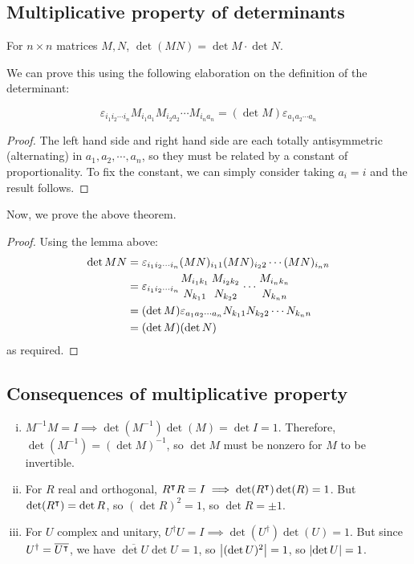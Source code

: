 \subsection{Multiplicative property of determinants}
\begin{theorem}
	For \(n\times n\) matrices \(M, N\), \(\det (MN) = \det M \cdot \det N\).
\end{theorem}
\noindent We can prove this using the following elaboration on the definition of the determinant:
\begin{lemma}
	\[
		\varepsilon_{i_1 i_2 \cdots i_n} M_{i_1 a_1} M_{i_2 a_2} \cdots M_{i_n a_n} = (\det M) \varepsilon_{a_1 a_2 \cdots a_n}
	\]
\end{lemma}
\begin{proof}
	The left hand side and right hand side are each totally antisymmetric (alternating) in \(a_1, a_2, \cdots, a_n\), so they must be related by a constant of proportionality.
	To fix the constant, we can simply consider taking \(a_i = i\) and the result follows.
\end{proof}
\noindent Now, we prove the above theorem.
\begin{proof}
	Using the lemma above:
	\begin{align*}
		\det MN & = \varepsilon_{i_1 i_2 \cdots i_n} (MN)_{i_1 1} (MN)_{i_2 2} \cdots (MN)_{i_n n}                                                    \\
		        & = \varepsilon_{i_1 i_2 \cdots i_n} {M_{i_1 k_1} \atop N_{k_1 1}} {M_{i_2 k_2} \atop N_{k_2 2}} \cdots {M_{i_n k_n} \atop N_{k_n n}} \\
		        & = (\det M) \varepsilon_{a_1 a_2 \cdots a_n} N_{k_1 1} N_{k_2 2} \cdots N_{k_n n}                                                    \\
		        & = (\det M)(\det N)
	\end{align*}
	as required.
\end{proof}

\subsection{Consequences of multiplicative property}
\begin{enumerate}[(i)]
	\item \(M^{-1}M = I \implies \det(M^{-1}) \det(M) = \det I = 1\).
	      Therefore, \(\det (M^{-1}) = (\det M)^{-1}\), so \(\det M\) must be nonzero for \(M\) to be invertible.
	\item For \(R\) real and orthogonal, \(R^\intercal R = I \implies \det(R^\intercal) \det(R) = 1\).
	      But \(\det (R^\intercal) = \det R\), so \((\det R)^2 = 1\), so \(\det R = \pm 1\).
	\item For \(U\) complex and unitary, \(U^\dagger U = I \implies \det(U^\dagger) \det(U) = 1\).
	      But since \(U^\dagger = \overline{U^\intercal}\), we have \(\overline{\det U} \det U = 1\), so \(\abs{(\det U)^2} = 1\), so \(\abs{\det U} = 1\).
\end{enumerate}

